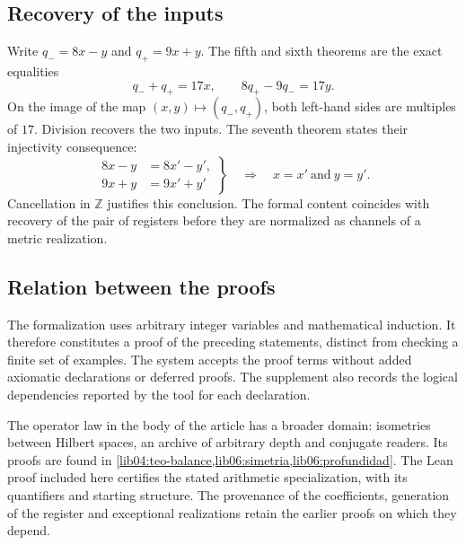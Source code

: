 \subsection*{Recovery of the inputs}

Write \(q_-=8x-y\) and \(q_+=9x+y\). The fifth and sixth theorems
are the exact equalities
\[
 q_-+q_+=17x,\qquad 8q_+-9q_-=17y.
\]
On the image of the map \((x,y)\mapsto(q_-,q_+)\), both left-hand
sides are multiples of \(17\). Division recovers the two
inputs. The seventh theorem states their injectivity consequence:
\[
 \left.
 \begin{aligned}
 8x-y&=8x'-y',\\
 9x+y&=9x'+y'
 \end{aligned}
 \right\}
 \quad\Longrightarrow\quad x=x'\ \text{and}\ y=y'.
\]
Cancellation in \(\mathbb Z\) justifies this conclusion. The formal
content coincides with recovery of the pair of registers before
they are normalized as channels of a metric realization.

\subsection*{Relation between the proofs}

The formalization uses arbitrary integer variables and mathematical
induction. It therefore constitutes a proof of the preceding statements,
distinct from checking a finite set of examples. The system
accepts the proof terms without added axiomatic declarations or
deferred proofs. The supplement also records the logical
dependencies reported by the tool for each declaration.

The operator law in the body of the article has a broader domain:
isometries between Hilbert spaces, an archive of arbitrary depth and
conjugate readers. Its proofs are found in
\cref{lib04:teo-balance,lib06:simetria,lib06:profundidad}. The Lean proof
included here certifies the stated arithmetic specialization, with
its quantifiers and starting structure. The provenance of the
coefficients, generation of the register and exceptional realizations
retain the earlier proofs on which they depend.
